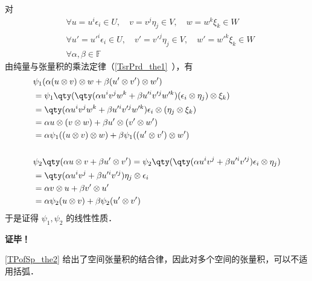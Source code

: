 对
\begin{equation}
\begin{aligned}
&\forall u=u^i\epsilon_i\in U,\quad v=v^j\eta_j\in V,\quad w=w^k\xi_k\in W\\
&\forall u'=u'^i\epsilon_i\in U,\quad v'=v'^j\eta_j\in V,\quad w'=w'^k\xi_k\in W\\
&\forall \alpha,\beta \in\mathbb F
\end{aligned}
\end{equation}
由纯量与张量积的乘法定律（\autoref{TsrPrd_the1}~），有
\begin{equation}
\begin{aligned}
&\psi_1(\alpha(u\otimes v)\otimes w+\beta(u'\otimes v')\otimes w')\\
&=\psi_1\qty(\qty(\alpha u^iv^jw^k+\beta u'^iv'^jw'^k)(\epsilon_i\otimes\eta_j)\otimes\xi_k)\\
&=\qty(\alpha u^iv^jw^k+\beta u'^iv'^jw'^k)\epsilon_i\otimes(\eta_j\otimes\xi_k)\\
&=\alpha u\otimes (v\otimes w)+\beta u'\otimes (v'\otimes w')\\
&=\alpha\psi_1((u\otimes v)\otimes w)+\beta\psi_1((u'\otimes v')\otimes w')\\
\\
&\psi_2\qty(\alpha u\otimes v+\beta u'\otimes v')=\psi_2\qty(\qty(\alpha u^iv^j+\beta u'^iv'^j)\epsilon_i\otimes\eta_j)\\
&=\qty(\alpha u^iv^j+\beta u'^iv'^j)\eta_j\otimes\epsilon_i\\
&=\alpha v\otimes u+\beta v'\otimes u'\\
&=\alpha\psi_2(u\otimes v)+\beta\psi_2(u'\otimes v')
\end{aligned}
\end{equation}
于是证得  $\psi_1,\psi_2$ 的线性性质．

\textbf{证毕！}

\autoref{TPofSp_the2} 给出了空间张量积的结合律，因此对多个空间的张量积，可以不适用括弧．

